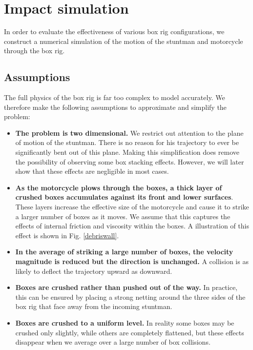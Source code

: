\documentclass[12pt,a4paper,titlepage]{article}
\begin{document}
\section{Impact simulation}

In order to evaluate the effectiveness of various box rig configurations, we construct a numerical simulation
of the motion of the stuntman and motorcycle through the box rig.

\subsection{Assumptions}

The full physics of the box rig is far too complex to model accurately.  We therefore make the following
assumptions to approximate and simplify the problem:

\begin{itemize}

\item {\bf The problem is two dimensional.}  We restrict out attention to the plane of motion of the stuntman.
There is no reason for his trajectory to ever be significantly bent out of this plane.  Making this
simplification does remove the possibility of observing some box stacking effects.  However, we will
later show that these effects are negligible in most cases.

\item {\bf As the motorcycle plows through the boxes, a thick layer of crushed boxes accumulates against
its front and lower surfaces}.  These layers increase the effective size of the motorcycle and cause
it to strike a larger number of boxes as it moves.  We assume that this captures the effects of internal
friction and viscosity within the boxes.  A illustration of this effect is shown in Fig. \ref{debriswall}.

\item {\bf In the average of striking a large number of boxes, the velocity magnitude is reduced but the
direction is unchanged.}  A collision is as likely to deflect the trajectory upward as downward.

\item {\bf Boxes are crushed rather than pushed out of the way.}  In practice, this can be ensured by placing
a strong netting around the three sides of the box rig that face away from the incoming stuntman.

\item {\bf Boxes are crushed to a uniform level.}  In reality some boxes may be crushed only slightly,
while others are completely flattened, but these effects disappear when we average over a large number of box collisions.

\end{itemize}
\end{document}

